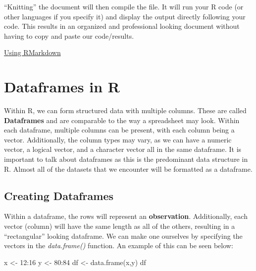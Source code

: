 \documentclass[
  letterpaper,
  DIV=11,
  numbers=noendperiod]{scrreprt}
\newenvironment{Shaded}{\begin{snugshade}}{\end{snugshade}}
\newcommand{\DecValTok}[1]{\textcolor[rgb]{0.68,0.00,0.00}{#1}}
\newcommand{\FunctionTok}[1]{\textcolor[rgb]{0.28,0.35,0.67}{#1}}
\newcommand{\NormalTok}[1]{\textcolor[rgb]{0.00,0.23,0.31}{#1}}
\newcommand{\OtherTok}[1]{\textcolor[rgb]{0.00,0.23,0.31}{#1}}
\newcommand{\SpecialCharTok}[1]{\textcolor[rgb]{0.37,0.37,0.37}{#1}}
\begin{document}
``Knitting'' the document will then compile the file. It will run your R
code (or other languages if you specify it) and display the output
directly following your code. This results in an organized and
professional looking document without having to copy and paste our
code/results.

\begin{watch}{}{}
    \href{https://youtu.be/Sm6aMty-xiE}{Using RMarkdown}
\end{watch}


\chapter{Dataframes in R}\label{dataframes-in-r}

Within R, we can form structured data with multiple columns. These are
called \textbf{Dataframes} and are comparable to the way a spreadsheet
may look. Within each dataframe, multiple columns can be present, with
each column being a vector. Additionally, the column types may vary, as
we can have a numeric vector, a logical vector, and a character vector
all in the same dataframe. It is important to talk about dataframes as
this is the predominant data structure in R. Almost all of the datasets
that we encounter will be formatted as a dataframe.

\section{Creating Dataframes}\label{creating-dataframes}

Within a dataframe, the rows will represent an \textbf{observation}.
Additionally, each vector (column) will have the same length as all of
the others, resulting in a ``rectangular'' looking dataframe. We can
make one ourselves by specifying the vectors in the \emph{data.frame()}
function. An example of this can be seen below:

\begin{Shaded}
\begin{Highlighting}[]
\NormalTok{x }\OtherTok{\textless{}{-}} \DecValTok{12}\SpecialCharTok{:}\DecValTok{16}
\NormalTok{y }\OtherTok{\textless{}{-}} \DecValTok{80}\SpecialCharTok{:}\DecValTok{84}
\NormalTok{df }\OtherTok{\textless{}{-}} \FunctionTok{data.frame}\NormalTok{(x,y)}
\NormalTok{df}
\end{Highlighting}
\end{Shaded}
\end{document}
